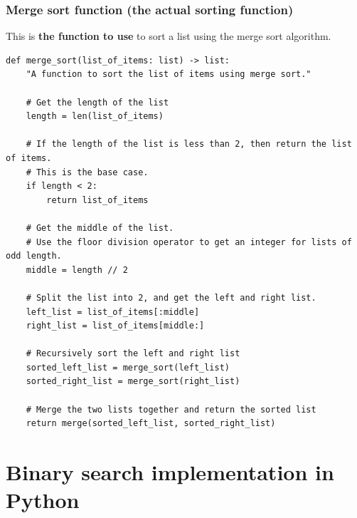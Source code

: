 \documentclass[11pt]{article}
\begin{document}
 \newpage

\subsubsection{Merge sort function (the actual sorting function)}
\label{sec:org4b99e71}
This is \textbf{the function to use} to sort a list using the merge sort algorithm.
\begin{verbatim}
def merge_sort(list_of_items: list) -> list:
    "A function to sort the list of items using merge sort."

    # Get the length of the list
    length = len(list_of_items)

    # If the length of the list is less than 2, then return the list of items.
    # This is the base case.
    if length < 2:
        return list_of_items

    # Get the middle of the list.
    # Use the floor division operator to get an integer for lists of odd length.
    middle = length // 2

    # Split the list into 2, and get the left and right list.
    left_list = list_of_items[:middle]
    right_list = list_of_items[middle:]

    # Recursively sort the left and right list
    sorted_left_list = merge_sort(left_list)
    sorted_right_list = merge_sort(right_list)

    # Merge the two lists together and return the sorted list
    return merge(sorted_left_list, sorted_right_list)
\end{verbatim}

 \newpage

\section{Binary search implementation in Python}
\label{sec:org0fdbcfe}
\end{document}
